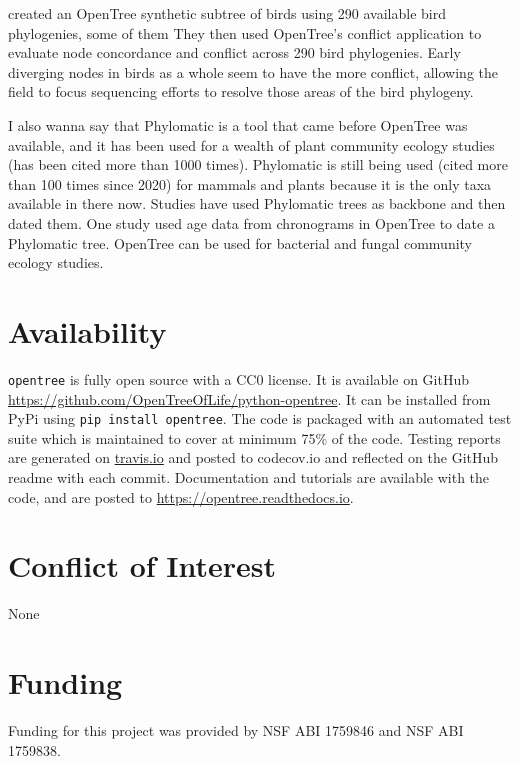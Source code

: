 \documentclass[oupdraft]{sysbio_sse}
\begin{document}
\citep{brown2017development} created an OpenTree synthetic subtree of birds using
290 available bird phylogenies, some of them
They then used OpenTree's conflict application to evaluate node concordance and
conflict across 290 bird phylogenies. Early diverging nodes in
 birds as a whole seem to have the more conflict, allowing the field to focus sequencing
 efforts to resolve those areas of the bird phylogeny.





I also wanna say that Phylomatic \citep{webb2005phylomatic} is a tool that came before
OpenTree was available, and it has been used for a wealth of plant community ecology
studies (has been cited more than 1000 times).
Phylomatic is still being used (cited more than 100 times since 2020) for mammals
and plants because it is the only taxa available in there now.
Studies have used Phylomatic trees as backbone and then dated them. One study used
age data from chronograms in OpenTree to date a Phylomatic tree.
OpenTree can be used for bacterial and fungal community ecology studies.





\section{Availability}
\label{sec6}

\texttt{opentree} is fully open source with a CC0 license. It is available on GitHub \url{ https://github.com/OpenTreeOfLife/python-opentree}. It can be installed from PyPi using \texttt{pip install opentree}. The code is packaged with an automated test suite which is maintained to cover at minimum 75\% of the code. Testing reports are generated on \url{travis.io} and posted to {codecov.io} and reflected on the GitHub readme with each commit. Documentation and tutorials are available with the code, and are posted to \url{https://opentree.readthedocs.io}.


\section{Conflict of Interest}
None

\section{Funding}
Funding for this project was provided by NSF ABI 1759846 and NSF ABI 1759838.
\end{document}
